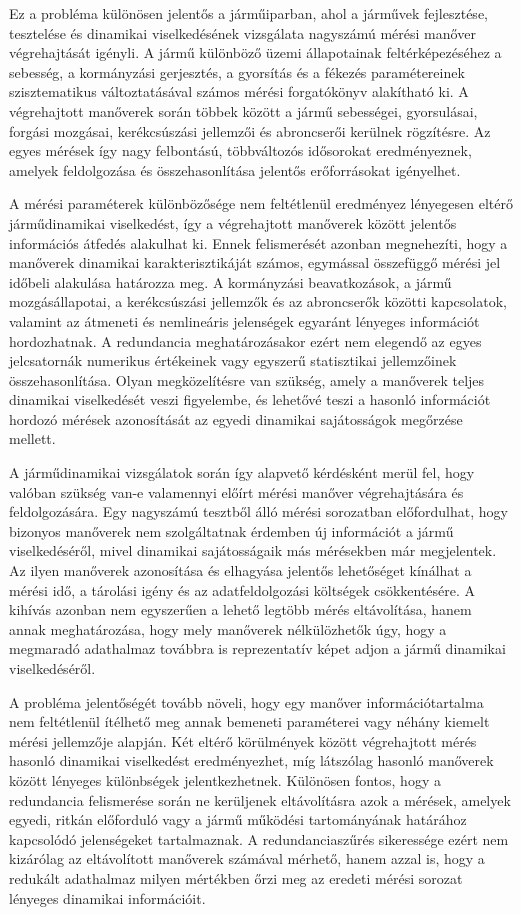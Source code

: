 \documentclass[12pt,a4paper,onehalfspacing, oneside]{book} %
\begin{document}
Ez a probléma különösen jelentős a járműiparban, ahol a járművek fejlesztése, tesztelése és dinamikai viselkedésének vizsgálata nagyszámú mérési manőver végrehajtását igényli. A jármű különböző üzemi állapotainak feltérképezéséhez a sebesség, a kormányzási gerjesztés, a gyorsítás és a fékezés paramétereinek szisztematikus változtatásával számos mérési forgatókönyv alakítható ki. A végrehajtott manőverek során többek között a jármű sebességei, gyorsulásai, forgási mozgásai, kerékcsúszási jellemzői és abroncserői kerülnek rögzítésre. Az egyes mérések így nagy felbontású, többváltozós idősorokat eredményeznek, amelyek feldolgozása és összehasonlítása jelentős erőforrásokat igényelhet.

A mérési paraméterek különbözősége nem feltétlenül eredményez lényegesen eltérő járműdinamikai viselkedést, így a végrehajtott manőverek között jelentős információs átfedés alakulhat ki. Ennek felismerését azonban megnehezíti, hogy a manőverek dinamikai karakterisztikáját számos, egymással összefüggő mérési jel időbeli alakulása határozza meg. A kormányzási beavatkozások, a jármű mozgásállapotai, a kerékcsúszási jellemzők és az abroncserők közötti kapcsolatok, valamint az átmeneti és nemlineáris jelenségek egyaránt lényeges információt hordozhatnak. A redundancia meghatározásakor ezért nem elegendő az egyes jelcsatornák numerikus értékeinek vagy egyszerű statisztikai jellemzőinek összehasonlítása. Olyan megközelítésre van szükség, amely a manőverek teljes dinamikai viselkedését veszi figyelembe, és lehetővé teszi a hasonló információt hordozó mérések azonosítását az egyedi dinamikai sajátosságok megőrzése mellett.

A járműdinamikai vizsgálatok során így alapvető kérdésként merül fel, hogy valóban szükség van-e valamennyi előírt mérési manőver végrehajtására és feldolgozására. Egy nagyszámú tesztből álló mérési sorozatban előfordulhat, hogy bizonyos manőverek nem szolgáltatnak érdemben új információt a jármű viselkedéséről, mivel dinamikai sajátosságaik más mérésekben már megjelentek. Az ilyen manőverek azonosítása és elhagyása jelentős lehetőséget kínálhat a mérési idő, a tárolási igény és az adatfeldolgozási költségek csökkentésére. A kihívás azonban nem egyszerűen a lehető legtöbb mérés eltávolítása, hanem annak meghatározása, hogy mely manőverek nélkülözhetők úgy, hogy a megmaradó adathalmaz továbbra is reprezentatív képet adjon a jármű dinamikai viselkedéséről.

A probléma jelentőségét tovább növeli, hogy egy manőver információtartalma nem feltétlenül ítélhető meg annak bemeneti paraméterei vagy néhány kiemelt mérési jellemzője alapján. Két eltérő körülmények között végrehajtott mérés hasonló dinamikai viselkedést eredményezhet, míg látszólag hasonló manőverek között lényeges különbségek jelentkezhetnek. Különösen fontos, hogy a redundancia felismerése során ne kerüljenek eltávolításra azok a mérések, amelyek egyedi, ritkán előforduló vagy a jármű működési tartományának határához kapcsolódó jelenségeket tartalmaznak. A redundanciaszűrés sikeressége ezért nem kizárólag az eltávolított manőverek számával mérhető, hanem azzal is, hogy a redukált adathalmaz milyen mértékben őrzi meg az eredeti mérési sorozat lényeges dinamikai információit.
\end{document}
